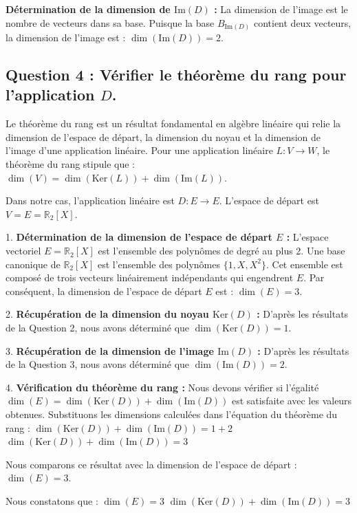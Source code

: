 \documentclass{report}
\begin{document}
\textbf{Détermination de la dimension de $\text{Im}(D)$ :}
La dimension de l'image est le nombre de vecteurs dans sa base.
Puisque la base $B_{\text{Im}(D)}$ contient deux vecteurs, la dimension de l'image est :
$\dim(\text{Im}(D)) = 2$.

\subsection*{Question 4 : Vérifier le théorème du rang pour l'application $D$.}

Le théorème du rang est un résultat fondamental en algèbre linéaire qui relie la dimension de l'espace de départ, la dimension du noyau et la dimension de l'image d'une application linéaire. Pour une application linéaire $L: V \to W$, le théorème du rang stipule que :
$\dim(V) = \dim(\text{Ker}(L)) + \dim(\text{Im}(L))$.

Dans notre cas, l'application linéaire est $D: E \to E$. L'espace de départ est $V = E = \mathbb{R}_2[X]$.

1.  \textbf{Détermination de la dimension de l'espace de départ $E$ :}
    L'espace vectoriel $E = \mathbb{R}_2[X]$ est l'ensemble des polynômes de degré au plus 2.
    Une base canonique de $\mathbb{R}_2[X]$ est l'ensemble des polynômes $\{1, X, X^2\}$.
    Cet ensemble est composé de trois vecteurs linéairement indépendants qui engendrent $E$.
    Par conséquent, la dimension de l'espace de départ $E$ est :
    $\dim(E) = 3$.

2.  \textbf{Récupération de la dimension du noyau $\text{Ker}(D)$ :}
    D'après les résultats de la Question 2, nous avons déterminé que $\dim(\text{Ker}(D)) = 1$.

3.  \textbf{Récupération de la dimension de l'image $\text{Im}(D)$ :}
    D'après les résultats de la Question 3, nous avons déterminé que $\dim(\text{Im}(D)) = 2$.

4.  \textbf{Vérification du théorème du rang :}
    Nous devons vérifier si l'égalité $\dim(E) = \dim(\text{Ker}(D)) + \dim(\text{Im}(D))$ est satisfaite avec les valeurs obtenues.
    Substituons les dimensions calculées dans l'équation du théorème du rang :
    $\dim(\text{Ker}(D)) + \dim(\text{Im}(D)) = 1 + 2$
    $\dim(\text{Ker}(D)) + \dim(\text{Im}(D)) = 3$

    Nous comparons ce résultat avec la dimension de l'espace de départ :
    $\dim(E) = 3$.

    Nous constatons que :
    $\dim(E) = 3$
    $\dim(\text{Ker}(D)) + \dim(\text{Im}(D)) = 3$
\end{document}
